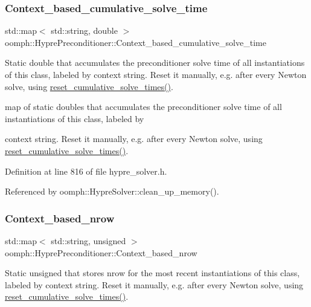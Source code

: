 \subsubsection{\texorpdfstring{Context\+\_\+based\+\_\+cumulative\+\_\+solve\+\_\+time}{Context\_based\_cumulative\_solve\_time}}
{\footnotesize\ttfamily std\+::map$<$ std\+::string, double $>$ oomph\+::\+Hypre\+Preconditioner\+::\+Context\+\_\+based\+\_\+cumulative\+\_\+solve\+\_\+time\hspace{0.3cm}{\ttfamily [static]}}



Static double that accumulates the preconditioner solve time of all instantiations of this class, labeled by context string. Reset it manually, e.\+g. after every Newton solve, using \hyperlink{classoomph_1_1HyprePreconditioner_a126763a53b2c687bc1b150d0fc64fbb6}{reset\+\_\+cumulative\+\_\+solve\+\_\+times()}. 

map of static doubles that accumulates the preconditioner solve time of all instantiations of this class, labeled by

context string. Reset it manually, e.\+g. after every Newton solve, using \hyperlink{classoomph_1_1HyprePreconditioner_a126763a53b2c687bc1b150d0fc64fbb6}{reset\+\_\+cumulative\+\_\+solve\+\_\+times()}. 

Definition at line 816 of file hypre\+\_\+solver.\+h.



Referenced by oomph\+::\+Hypre\+Solver\+::clean\+\_\+up\+\_\+memory().

\mbox{\label{classoomph_1_1HyprePreconditioner_a7d378145491234f85def4915c2e98249}} 
\subsubsection{\texorpdfstring{Context\+\_\+based\+\_\+nrow}{Context\_based\_nrow}}
{\footnotesize\ttfamily std\+::map$<$ std\+::string, unsigned $>$ oomph\+::\+Hypre\+Preconditioner\+::\+Context\+\_\+based\+\_\+nrow\hspace{0.3cm}{\ttfamily [static]}}



Static unsigned that stores nrow for the most recent instantiations of this class, labeled by context string. Reset it manually, e.\+g. after every Newton solve, using \hyperlink{classoomph_1_1HyprePreconditioner_a126763a53b2c687bc1b150d0fc64fbb6}{reset\+\_\+cumulative\+\_\+solve\+\_\+times()}. 



